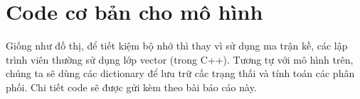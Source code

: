 \section{Code cơ bản cho mô hình}
\noindent Giống như đồ thị, để tiết kiệm bộ nhớ thì thay vì sử dụng ma trận kề, các lập trình viên thường sử dụng lớp vector (trong C++). Tương tự với mô hình trên, chúng ta sẽ dùng các dictionary để lưu trữ cấc trạng thấi và tính toán các phân phối. Chi tiết code sẽ được gửi kèm theo bài báo cáo này. 
 

